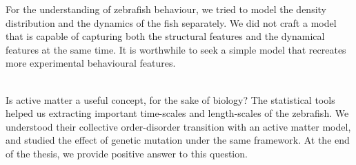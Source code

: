 \documentclass[11pt,twoside]{report}
\begin{document}
For the understanding of zebrafish behaviour, we tried to model the density distribution and the dynamics of the fish separately. We did not craft a model that is capable of capturing both the structural features and the dynamical features at the same time. It is worthwhile to seek a simple model that recreates more experimental behavioural features.

\;\\

Is active matter a useful concept, for the sake of biology? The statistical tools helped us extracting important time-scales and length-scales of the zebrafish. We understood their collective order-disorder transition with an active matter model, and studied the effect of genetic mutation under the same framework. At the end of the thesis, we provide positive answer to this question.
\end{document}
